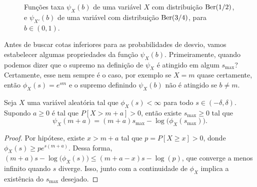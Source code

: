 \begin{figure}[!ht]
  \centering
  \caption{Funções taxa $\psi_{X}(b)$ de uma variável $X$ com distribuição $\operatorname{Ber}(1/2)$, e $\psi_{X'}(b)$ de uma variável com distribuição $\operatorname{Ber}(3/4)$, para $b \in (0,1)$.}
\end{figure}

Antes de buscar cotas inferiores para as probabilidades de desvio, vamos estabelecer algumas propriedades da função $\psi_X(b)$.
Primeiramente, quando podemos dizer que o supremo na definição de $\psi_X$ é atingido em algum $s_{\text{max}}$?
Certamente, esse nem sempre é o caso, por exemplo se $X = m$ quase certamente, então $\phi_X(s) = e^{sm}$ e o supremo definindo $\psi_X(b)$ não é atingido se $b \neq m$.

\begin{lemma}
  \label{l:smax_PGD}
  Seja $X$ uma variável aleatória tal que $\phi_X(s) < \infty$ para todo $s \in (-\delta, \delta)$.
  Supondo $a \geq 0$ é tal que $P[X > m + a] > 0$, então existe $s_{\text{max}} \geq 0$ tal que
  \begin{equation}
    \psi_X(m + a) = (m + a)s_{\text{max}} - \log\big(\phi_X(s_\text{max})\big).
  \end{equation}
\end{lemma}

\begin{proof}
  Por hipótese, existe $x > m + a$ tal que $p = P[X \geq x] > 0$, donde $\phi_X(s) \geq p e^{s(m+a)}$.
  Dessa forma, $(m + a)s - \log\big( \phi_X(s) \big) \leq (m + a - x)s - \log(p)$, que converge a menos infinito quando $s$ diverge.
  Isso, junto com a continuidade de $\phi_X$ implica a existência do $s_{\text{max}}$ desejado.
\end{proof}


